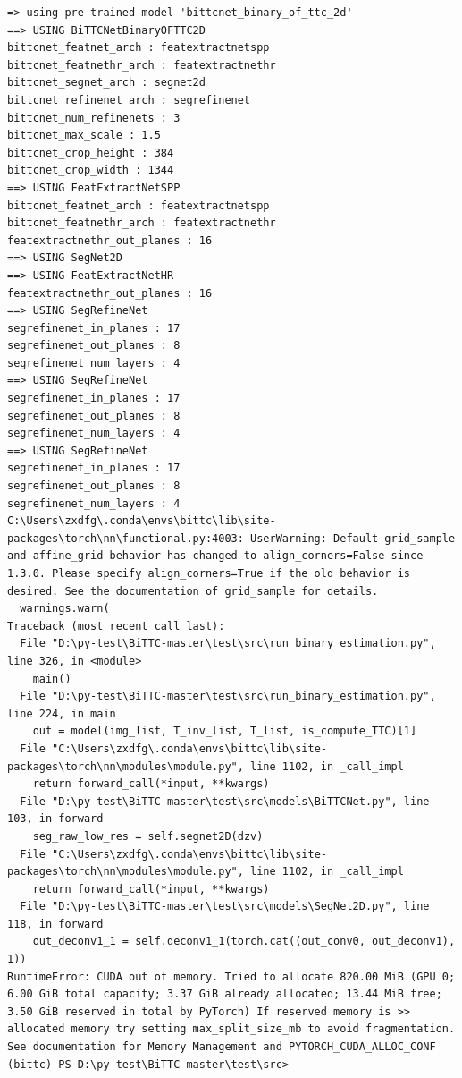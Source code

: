 \documentclass[10pt,UTF8]{ctexart}
\begin{document}
\begin{verbatim}
=> using pre-trained model 'bittcnet_binary_of_ttc_2d'
==> USING BiTTCNetBinaryOFTTC2D
bittcnet_featnet_arch : featextractnetspp
bittcnet_featnethr_arch : featextractnethr
bittcnet_segnet_arch : segnet2d
bittcnet_refinenet_arch : segrefinenet
bittcnet_num_refinenets : 3
bittcnet_max_scale : 1.5
bittcnet_crop_height : 384
bittcnet_crop_width : 1344
==> USING FeatExtractNetSPP
bittcnet_featnet_arch : featextractnetspp
bittcnet_featnethr_arch : featextractnethr
featextractnethr_out_planes : 16
==> USING SegNet2D
==> USING FeatExtractNetHR
featextractnethr_out_planes : 16
==> USING SegRefineNet
segrefinenet_in_planes : 17
segrefinenet_out_planes : 8
segrefinenet_num_layers : 4
==> USING SegRefineNet
segrefinenet_in_planes : 17
segrefinenet_out_planes : 8
segrefinenet_num_layers : 4
==> USING SegRefineNet
segrefinenet_in_planes : 17
segrefinenet_out_planes : 8
segrefinenet_num_layers : 4
C:\Users\zxdfg\.conda\envs\bittc\lib\site-packages\torch\nn\functional.py:4003: UserWarning: Default grid_sample and affine_grid behavior has changed to align_corners=False since 1.3.0. Please specify align_corners=True if the old behavior is desired. See the documentation of grid_sample for details.
  warnings.warn(
Traceback (most recent call last):
  File "D:\py-test\BiTTC-master\test\src\run_binary_estimation.py", line 326, in <module>
    main()
  File "D:\py-test\BiTTC-master\test\src\run_binary_estimation.py", line 224, in main
    out = model(img_list, T_inv_list, T_list, is_compute_TTC)[1]
  File "C:\Users\zxdfg\.conda\envs\bittc\lib\site-packages\torch\nn\modules\module.py", line 1102, in _call_impl
    return forward_call(*input, **kwargs)
  File "D:\py-test\BiTTC-master\test\src\models\BiTTCNet.py", line 103, in forward
    seg_raw_low_res = self.segnet2D(dzv)
  File "C:\Users\zxdfg\.conda\envs\bittc\lib\site-packages\torch\nn\modules\module.py", line 1102, in _call_impl
    return forward_call(*input, **kwargs)
  File "D:\py-test\BiTTC-master\test\src\models\SegNet2D.py", line 118, in forward
    out_deconv1_1 = self.deconv1_1(torch.cat((out_conv0, out_deconv1), 1))
RuntimeError: CUDA out of memory. Tried to allocate 820.00 MiB (GPU 0; 6.00 GiB total capacity; 3.37 GiB already allocated; 13.44 MiB free; 3.50 GiB reserved in total by PyTorch) If reserved memory is >> allocated memory try setting max_split_size_mb to avoid fragmentation.  See documentation for Memory Management and PYTORCH_CUDA_ALLOC_CONF
(bittc) PS D:\py-test\BiTTC-master\test\src>
\end{verbatim}

\newpage








\clearpage
\end{document}
